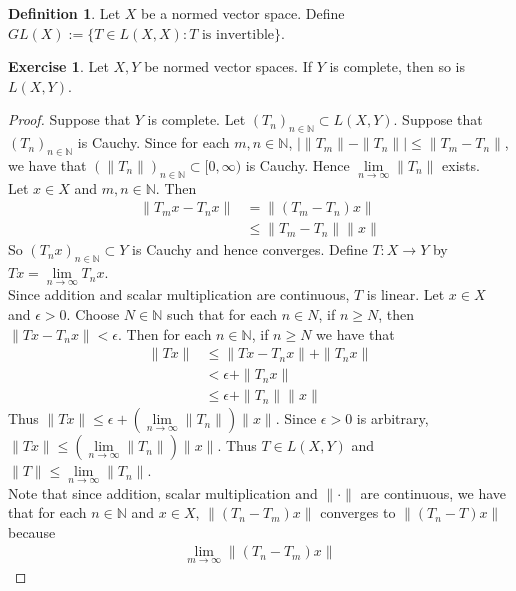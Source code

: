 \documentclass[12pt]{amsart}
\theoremstyle{definition}
\newtheorem{defn}[definition]{Definition}
\newtheorem{ex}[definition]{Exercise}
\newcommand{\ep}{\epsilon}
\newcommand{\N}{\mathbb{N}}
\newcommand{\Rg}{[0,\infty)}
\newcommand{\limn}{\lim \limits_{n \rightarrow \infty}}
\newcommand{\lex}[1]{\label{ex:#1}}
\newcommand{\ld}[1]{\label{defn:#1}}
\begin{document}
	\begin{defn} \ld{42011}
		Let $X$ be a normed vector space. Define $GL(X) := \{T \in L(X,X): T \text{ is invertible}\}$.
	\end{defn}
	
	\begin{ex} \lex{42013}
		Let $X,Y$ be normed vector spaces. If $Y$ is complete, then so is $L(X,Y)$.
	\end{ex}
	
	\begin{proof}
		Suppose that $Y$ is complete. Let $(T_n)_{n \in \N} \subset L(X,Y)$. Suppose that $(T_n)_{n \in \N}$ is Cauchy. Since for each $m,n \in \N$, $\big\vert \|T_m \|- \|T_n \|\big\vert \leq \|T_m -T_n \|$, we have that $(\|T_n \|)_{n \in \N} \subset \Rg$ is Cauchy. Hence $\lim\limits_{n \rightarrow \infty}\|T_n \|$ exists. \vspace{1cm} \\ Let $x \in X$ and $m,n \in \N$. Then 
		\begin{align*}
			\|T_m x - T_n x \|
			&= \|(T_m-T_n) x \|\\
			&\leq \|T_m-T_n \|\|x \|
		\end{align*}
		So $(T_nx)_{n \in \N} \subset Y$ is Cauchy and hence converges. Define $T:X \rightarrow Y$ by $Tx = \lim\limits_{n \rightarrow \infty} T_nx$. \vspace{1cm}\\
		Since addition and scalar multiplication are continuous, $T$ is linear. Let $x \in X$ and $\ep>0$. Choose $N \in \N$ such that for each $n \in N$, if $n \geq N$, then $\|Tx - T_n x\|< \ep$. Then for each $n \in \N$, if $n \geq N$ we have that 
		\begin{align*}
			\|Tx\|
			&\leq \|Tx-T_nx \|+ \|T_nx \|\\
			&< \ep + \|T_nx \|\\
			&\leq \ep + \|T_n \|\|x \|
		\end{align*}  
		Thus $\|Tx \|\leq \ep +(\lim\limits_{n \rightarrow \infty} \|T_n \|) \|x \|$. Since $\ep >0$ is arbitrary, $\|Tx \|\leq (\lim\limits_{n \rightarrow \infty} \|T_n \|) \|x \|$. Thus $T \in L(X,Y)$ and $\|T \|\leq \limn \|T_n \|$. \vspace{1cm} \\
		Note that since addition, scalar multiplication and $\|\cdot \|$ are continuous, we have that for each $n \in \N$ and $x \in X$, $\|(T_n-T_m)x \|$ converges to $\|(T_n-T)x \|$ because 
		\begin{align*}
			\lim_{m \rightarrow \infty} \|(T_n-T_m)x \|

\end{align*}
\end{proof}
\end{document}
